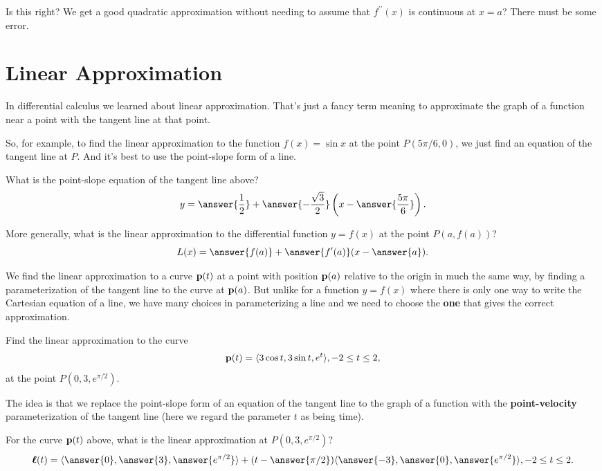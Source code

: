 \documentclass{ximera}
\begin{document}
Is this right? We get a good quadratic approximation without needing to assume that $f^{\prime\prime}(x)$ is continuous at $x=a$? There must be some error.



\section{Linear Approximation}
In differential calculus we learned about linear approximation. That's just a fancy term meaning to approximate the graph of a function near a point with the tangent line at that point.

So, for example, to find the linear approximation to the function $f(x) = \sin x$ at the point $P(5\pi/6,0)$, we just find an equation of the tangent line at $P$. And it's best to use the point-slope form of a line.

\begin{question}  \label{Qegbygyyu}
What is the point-slope equation of the tangent line above?
\[
    y = \answer{\frac{1}{2}} + \answer{-\frac{\sqrt{3}}{2}}\left( x - \answer{\frac{5\pi}{6}}  \right) .
\]
\end{question}

\begin{question}   \label{Qt43666}
More generally, what is the linear approximation to the differential function $y=f(x)$ at the point $P(a,f(a))$?
\[
     L(x) = \answer{f(a)} + \answer{f^\prime(a)} (x - \answer{a} ) .
\]
\end{question}


We find the linear approximation to a curve ${\bf p}(t)$ at a point with position ${\bf p}(a)$ relative to the origin in much the same way, by finding a parameterization of the tangent line to the curve at ${\bf p}(a)$. But unlike for a function $y=f(x)$ where there is only one way to write the Cartesian equation of a line, we have many choices in parameterizing a line and we need to choose the {\bf one} that gives the correct approximation. 

\begin{question}   \label{Qggkuthds}
Find the linear approximation to the curve
\[
   {\bf p}(t) = \langle 3 \cos t, 3\sin t, e^t \rangle, -2\leq t \leq 2 ,
\]
at the point $P(0,3,e^{\pi/2})$.

The idea is that we replace the point-slope form of an equation of the tangent line to the graph of a function with the {\bf point-velocity} parameterization of the tangent line (here we regard the parameter $t$ as being time).

For the curve ${\bf p}(t)$ above, what is the linear approximation at $P(0,3,e^{\pi/2})$?
\[
   \boldsymbol{\ell}(t) = \langle  \answer{0}, \answer{3}  , \answer{e^{\pi/2}}  \rangle  + (t - \answer{\pi/2}) \langle \answer{-3}, \answer{0}, \answer{e^{\pi/2}}  \rangle , -2\leq t \leq 2 .
\]
\end{question}
\end{document}
